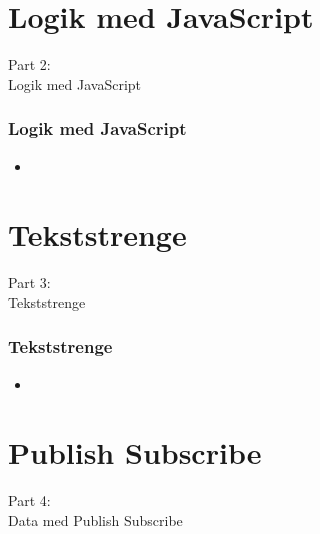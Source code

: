 \section{Logik med JavaScript}
\begin{frame}
    \vspace{25mm}
    \begin{center}
        \Huge{Part 2:\\Logik med JavaScript}
    \end{center}
\end{frame}

\begin{frame}
    \frametitle{Logik med JavaScript}
    \begin{itemize}
      \item 
    \end{itemize}
\end{frame}

\section{Tekststrenge}
\begin{frame}
    \vspace{25mm}
    \begin{center}
        \Huge{Part 3:\\Tekststrenge}
    \end{center}
\end{frame}

\begin{frame}
    \frametitle{Tekststrenge}
    \begin{itemize}
      \item 
    \end{itemize}
\end{frame}

\section{Publish Subscribe}
\begin{frame}
    \vspace{25mm}
    \begin{center}
        \Huge{Part 4:\\Data med Publish Subscribe}
    \end{center}
\end{frame}

